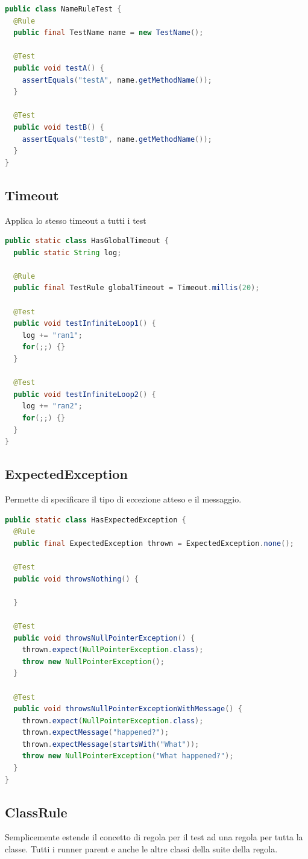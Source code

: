 \documentclass[11pt,a4paper]{book}
\begin{document}
\begin{lstlisting}[language = Java]
public class NameRuleTest {
  @Rule
  public final TestName name = new TestName();
  
  @Test
  public void testA() {
    assertEquals("testA", name.getMethodName());
  }
  
  @Test
  public void testB() {
    assertEquals("testB", name.getMethodName());
  }
}
\end{lstlisting}

\subsection{Timeout}
Applica lo stesso timeout a tutti i test
\begin{lstlisting}[language = Java]
public static class HasGlobalTimeout {
  public static String log;
  
  @Rule
  public final TestRule globalTimeout = Timeout.millis(20);
  
  @Test
  public void testInfiniteLoop1() {
    log += "ran1";
    for(;;) {}
  }
  
  @Test
  public void testInfiniteLoop2() {
    log += "ran2";
    for(;;) {}
  }
}
\end{lstlisting}

\subsection{ExpectedException}
Permette di specificare il tipo di eccezione atteso e il messaggio.

\begin{lstlisting}[language = Java]
public static class HasExpectedException {
  @Rule
  public final ExpectedException thrown = ExpectedException.none();

  @Test
  public void throwsNothing() {

  }

  @Test
  public void throwsNullPointerException() {
    thrown.expect(NullPointerException.class);
    throw new NullPointerException();
  }

  @Test
  public void throwsNullPointerExceptionWithMessage() {
    thrown.expect(NullPointerException.class);
    thrown.expectMessage("happened?");
    thrown.expectMessage(startsWith("What"));
    throw new NullPointerException("What happened?");
  }
}
\end{lstlisting}

\subsection{ClassRule}
Semplicemente estende il concetto di regola per il test ad una regola per tutta la classe. Tutti i runner parent e anche le altre classi della suite della regola.
\end{document}

